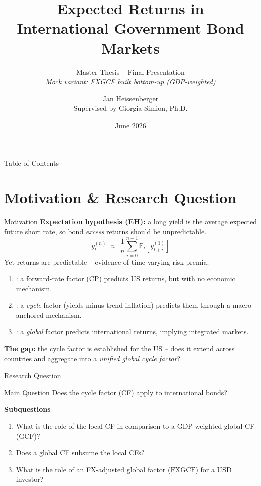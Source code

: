 \documentclass[10pt]{beamer}
\title[Exp. Returns in International Bond Markets]{Expected Returns in\\
  International Government Bond Markets}
\subtitle{Master Thesis -- Final Presentation\\{\normalsize\itshape Mock variant: FXGCF built bottom-up (GDP-weighted)}}
\author[Jan Heissenberger]{Jan Heissenberger\\
  Supervised by Giorgia Simion, Ph.D.}
\date{June 2026} %
\newcommand{\GCF}{\mathrm{GCF}}
\newcommand{\FXGCF}{\mathrm{FXGCF}}
\newcommand{\E}{\mathbb{E}}          %
\begin{document}
\begin{frame}
  \titlepage
\end{frame}

\begin{frame}{Table of Contents}
  \tableofcontents
\end{frame}

\section{Motivation \& Research Question}

\begin{frame}{Motivation}
  \textbf{Expectation hypothesis (EH):} a long yield is the average expected
  future short rate, so bond \emph{excess} returns should be unpredictable.
  \begin{equation*}
    y^{(n)}_{t} \;\approx\; \frac{1}{n}\sum_{i=0}^{n-1}
      \E_{t}\!\left[y^{(1)}_{t+i}\right]
  \end{equation*}
  Yet returns are \alert{predictable} -- evidence of time-varying risk premia:
  \begin{enumerate}
    \item \citet{cochrane2005}: a forward-rate factor (CP) predicts US returns,
      but with no economic mechanism.
    \item \citet{cieslak2015}: a \emph{cycle} factor (yields minus trend
      inflation) predicts them through a macro-anchored mechanism.
    \item \citet{dahlquist2013}: a \emph{global} factor predicts international
      returns, implying integrated markets.
  \end{enumerate}
  \vfill
  \textbf{The gap:} the cycle factor is established for the US -- does it extend
  across countries and aggregate into a \emph{unified global cycle factor}?
  \citep[cf.][]{bauer2020,zhang2021}
\end{frame}

\begin{frame}{Research Question}
  \begin{block}{Main Question}
    Does the \citet{cieslak2015} cycle factor (CF) apply to international
    bonds?
  \end{block}
  \textbf{Subquestions}
  \begin{enumerate}
    \item What is the role of the local CF in comparison to a GDP-weighted
      global CF ($\GCF$)?
    \item Does a global CF subsume the local CFs?
    \item What is the role of an FX-adjusted global factor ($\FXGCF$) for a
      USD investor?
  \end{enumerate}
\end{frame}
\end{document}

